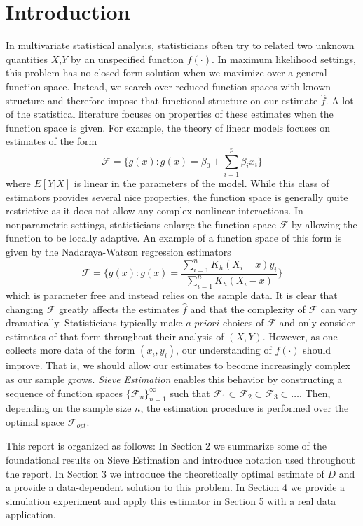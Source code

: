 \documentclass[12pt]{article}  %
\begin{document}
\section{Introduction}
In multivariate statistical analysis, statisticians often try to related two unknown quantities $X$,$Y$ by an unspecified function $f(\cdot)$. In maximum likelihood settings, this problem has no closed form solution when we maximize over a general function space. Instead, we search over reduced function spaces with known structure and therefore impose that functional structure on our estimate $\hat{f}$. A lot of the statistical literature focuses on properties of these estimates when the function space is given. For example, the theory of linear models focuses on estimates of the form $$\mathcal{F} = \Big\{g(x): g(x) = \beta_0 + \sum_{i=1}^{p}\beta_ix_i\Big\}$$ where $E[Y|X]$ is linear in the parameters of the model. While this class of estimators provides several nice properties, the function space is generally quite restrictive as it does not allow any complex nonlinear interactions. In nonparametric settings, statisticians enlarge the function space $\mathcal{F}$ by allowing the function to be locally adaptive. An example of a function space of this form is given by the Nadaraya-Watson regression estimators $$\mathcal{F} = \Big\{g(x): g(x) = \frac{\sum_{i=1}^n K_h(X_i - x)y_i}{\sum_{i=1}^n K_h(X_i - x)}\Big\}$$
which is parameter free and instead relies on the sample data. It is clear that changing $\mathcal{F}$ greatly affects the estimates $\hat{f}$ and that the complexity of $\mathcal{F}$ can vary dramatically. Statisticians typically make $\textit{a priori}$ choices of $\mathcal{F}$ and only consider estimates of that form throughout their analysis of $(X,Y)$. However, as one collects more data of the form $(x_i, y_i)$, our understanding of $f(\cdot)$ should improve. That is, we should allow our estimates to become increasingly complex as our sample grows. \textit{Sieve Estimation} enables this behavior by constructing a sequence of function spaces $\{\mathcal{F}_n\}_{n=1}^{\infty}$ such that $\mathcal{F}_1\subset\mathcal{F}_2\subset\mathcal{F}_3\subset\ldots$. Then, depending on the sample size $n$, the estimation procedure is performed over the optimal space $\mathcal{F}_{opt}$. 

This report is organized as follows: In Section 2 we  summarize some of the foundational results on Sieve Estimation and introduce notation used throughout the report. In Section 3 we introduce the theoretically optimal estimate of $D$ and a provide a data-dependent solution to this problem. In Section 4 we provide a simulation experiment and apply this estimator in Section 5 with a real data application. 
\end{document}
